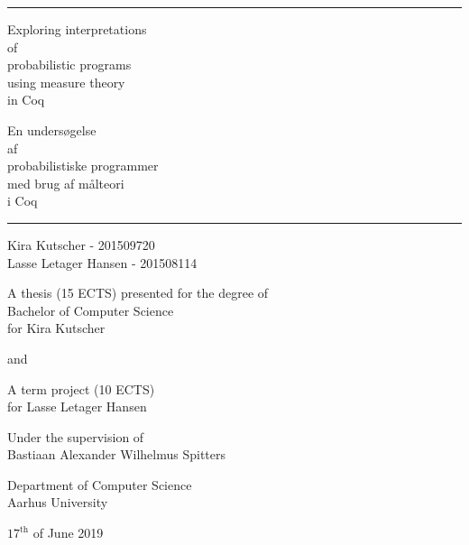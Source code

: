 \begin{titlepage}
  \hrule
  \vspace{0.8cm}
  \begin{minipage}{0.45\textwidth}
    \begin{center}
      \Large
      Exploring interpretations \\of\\ probabilistic programs\\
      using measure theory \\in Coq
    \end{center}
  \end{minipage}
  \begin{minipage}{0.5\textwidth}
    \begin{center}
      \Large
      En undersøgelse \\af\\
      probabilistiske programmer\\
      med brug af målteori\\
      i Coq
    \end{center}
  \end{minipage}
  \begin{center}

    \vspace{0.5cm}
    \hrule
    \vspace{0.5cm}

    \large
    Kira Kutscher - 201509720 \\
    Lasse Letager Hansen - 201508114

    \vfill

    A thesis (15 ECTS) presented for the degree of \\
    Bachelor of Computer Science \\
    for Kira Kutscher

    \vspace{0.5cm}

    and

    \vspace{0.5cm}
    
    A term project (10 ECTS)\\
    for Lasse Letager Hansen
    
    \vspace{1cm}

    Under the supervision of\\
    Bastiaan Alexander Wilhelmus Spitters

    \vspace{0.3cm}

    Department of Computer Science\\
    Aarhus University

    \vspace{0.3cm}
    
    $17^{\text{th}}$ of June 2019

  \end{center}
\end{titlepage}
